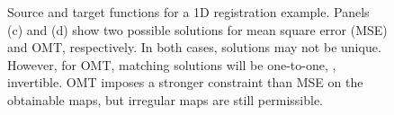 \documentclass[10pt,twocolumn,letterpaper]{article} %
\begin{document}
\begin{figure}
%       
%       
%       
  \caption{Source and target functions for a 1D registration example. Panels (c) and (d) show two possible solutions for mean square error (MSE) and OMT, respectively. In both cases,  solutions may not be unique. However, for OMT, matching solutions will be one-to-one, \ie, invertible. OMT imposes a stronger constraint than MSE on the obtainable maps, but irregular maps are still permissible.
  }
  \label{fig:matching_examples}
  \vspace{-0.2cm}
\end{figure}
\end{document}

